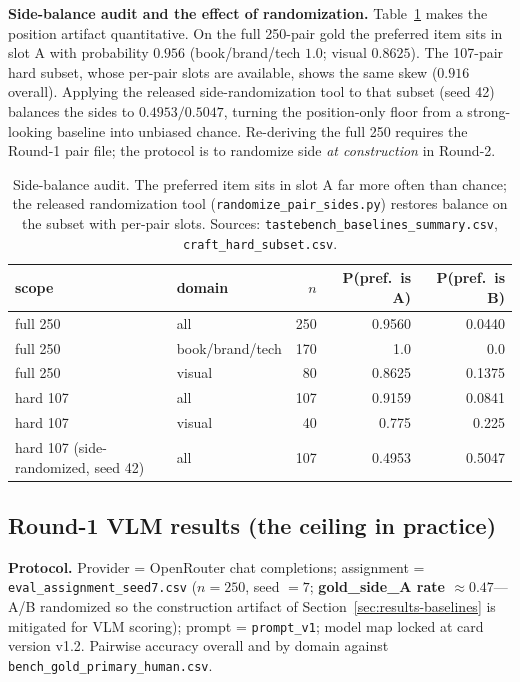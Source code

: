 \documentclass[11pt,a4paper]{article}
\begin{document}
\textbf{Side-balance audit and the effect of randomization.} Table~\ref{tab:side} makes the position artifact quantitative. On the full 250-pair gold the preferred item sits in slot A with probability $0.956$ (book/brand/tech $1.0$; visual $0.8625$). The 107-pair hard subset, whose per-pair slots are available, shows the same skew ($0.916$ overall). Applying the released side-randomization tool to that subset (seed 42) balances the sides to $0.4953/0.5047$, turning the position-only floor from a strong-looking baseline into unbiased chance. Re-deriving the full 250 requires the Round-1 pair file; the protocol is to randomize side \emph{at construction} in Round-2.

\begin{table}[t]
\centering
\small
\begin{tabular}{@{}llrrr@{}}
\toprule
scope & domain & $n$ & P(pref.\ is A) & P(pref.\ is B) \\
\midrule
full 250 & all              & 250 & 0.9560 & 0.0440 \\
full 250 & book/brand/tech  & 170 & 1.0    & 0.0    \\
full 250 & visual           & 80  & 0.8625 & 0.1375 \\
hard 107 & all              & 107 & 0.9159 & 0.0841 \\
hard 107 & visual           & 40  & 0.775  & 0.225  \\
\midrule
hard 107 (side-randomized, seed 42) & all & 107 & 0.4953 & 0.5047 \\
\bottomrule
\end{tabular}
\caption{Side-balance audit. The preferred item sits in slot A far more often than chance; the released randomization tool (\texttt{randomize\_pair\_sides.py}) restores balance on the subset with per-pair slots. Sources: \texttt{tastebench\_baselines\_summary.csv}, \texttt{craft\_hard\_subset.csv}.}
\label{tab:side}
\end{table}

\subsection{Round-1 VLM results (the ceiling in practice)}
\label{sec:results-vlm}

\textbf{Protocol.} Provider = OpenRouter chat completions; assignment = \texttt{eval\_assignment\_seed7.csv} ($n=250$, seed $=7$; \textbf{gold\_side\_A rate $\approx 0.47$}---A/B randomized so the construction artifact of Section~\ref{sec:results-baselines} is mitigated for VLM scoring); prompt = \texttt{prompt\_v1}; model map locked at card version v1.2. Pairwise accuracy overall and by domain against \texttt{bench\_gold\_primary\_human.csv}.
\end{document}
